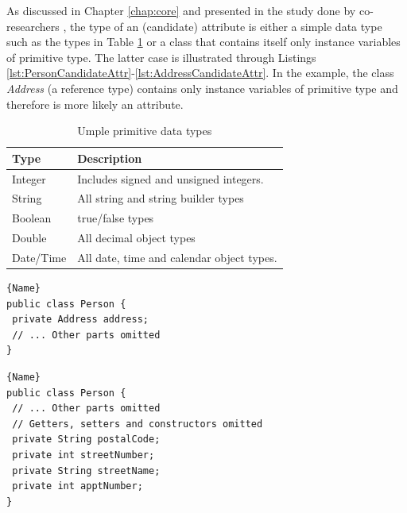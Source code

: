 As discussed in Chapter \ref{chap:core} and presented in the study done by co-researchers \cite{UmpleAttributes}, the type of an (candidate) attribute is either a simple data type such as the types in Table \ref{table:attributes2} or a class that contains itself only instance variables of primitive type. The latter case is illustrated through Listings \ref{lst:PersonCandidateAttr}-\ref{lst:AddressCandidateAttr}. In the example, the class \textit{Address} (a reference type) contains only instance variables of primitive type and therefore is more likely an attribute. 

\begin{table}
\caption{Umple primitive data types}
\label{table:attributes2}
\centering
    \begin{tabular}{ll}
		\toprule
		\rowcolor[HTML]{BBDAFF}
        \textbf{Type}      & \textbf{Description}                               \\ 
        \hline
        Integer   & Includes signed and unsigned integers.    \\ 
        String    & All string and string builder types       \\ 
        Boolean   & true/false types                          \\ 
        Double    & All decimal object types                  \\ 
        Date/Time & All date, time and calendar object types. \\
        \hline
    \end{tabular}
\end{table}

\noindent\begin{minipage}{.45\textwidth}
\begin{lstlisting}[style=java,caption=Person.java,label=lst:PersonCandidateAttr]{Name}
public class Person {
 private Address address;
 // ... Other parts omitted
}
\end{lstlisting}
\end{minipage}\hfill
\begin{minipage}{.45\textwidth}
\begin{lstlisting}[style=java,caption=Address.java,label=lst:AddressCandidateAttr]{Name}
public class Person {
 // ... Other parts omitted
 // Getters, setters and constructors omitted
 private String postalCode;
 private int streetNumber;
 private String streetName;
 private int apptNumber;
}
\end{lstlisting}
\end{minipage}

